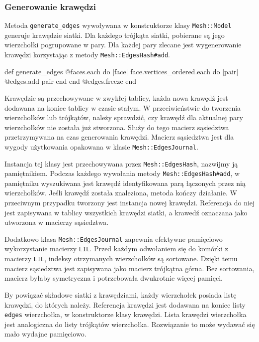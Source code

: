 \documentclass[10pt,a4paper]{article}
\newcommand{\f}[1]{\texttt{#1}}
\begin{document}
\subsubsection{Generowanie krawędzi}
\label{sec:generowanie_krawedzi}

Metoda \f{generate\_edges} wywoływana w konstruktorze klasy \f{Mesh::Model}
generuje krawędzie siatki. Dla każdego trójkąta siatki, pobierane są jego
wierzchołki pogrupowane w pary. Dla każdej pary zlecane jest wygenerowanie
krawędzi korzystając z metody \f{Mesh::EdgesHash\#add}.

\begin{SmallVerbatim}
    def generate_edges
      @faces.each do |face|
        face.vertices_ordered.each do |pair|
          @edges.add pair
        end
      end
      @edges.freeze
    end
\end{SmallVerbatim}

Krawędzie są przechowywane w zwykłej tablicy, każda nowa krawędź jest dodawana
na koniec tablicy w czasie stałym. W przeciwieństwie do tworzenia wierzchołków
lub trójkątów, należy sprawdzić, czy krawędź dla aktualnej pary wierzchołków
nie została już stworzona. Służy do tego macierz sąsiedztwa przetrzymywana na
czas generowania krawędzi. Macierz sąsiedztwa jest dla wygody użytkowania
opakowana w klasie \f{Mesh::EdgesJournal}.

Instancja tej klasy jest przechowywana przez \f{Mesh::EdgesHash}, nazwijmy ją
pamiętnikiem. Podczas każdego wywołania metody \f{Mesh::EdgesHash\#add}, w
pamiętniku wyszukiwana jest krawędź identyfikowana parą łączonych przez nią
wierzchołków. Jeśli krawędź została znaleziona, metoda kończy działanie. W
przeciwnym przypadku tworzony jest instancja nowej krawędzi. Referencja do
niej jest zapisywana w tablicy wszystkich krawędzi siatki, a krawedź oznaczana
jako utworzona w macierzy sąsiedztwa.

Dodatkowo klasa \f{Mesh::EdgesJournal} zapewnia efektywne pamięciowo
wykorzystanie macierzy \f{LIL}. Przed każdym odwołaniem się do komórki z
macierzy \f{LIL}, indeksy otrzymanych wierzchołków są sortowane. Dzięki temu
macierz sąsiedztwa jest zapisywana jako macierz trójkątna górna. Bez
sortowania, macierz byłaby symetryczna i potrzebowała dwukrotnie więcej
pamięci.

By powiązać składowe siatki z krawędziami, każdy wierzchołek posiada listę
krawędzi, do których należy. Referencja krawędzi jest dodawana na koniec listy
\f{edges} wierzchołka, w konstruktorze klasy krawędzi. Lista krawędzi
wierzchołka jest analogiczna do listy trójkątów wierzchołka. Rozwiązanie to
może wydawać się mało wydajne pamięciowo.
\end{document}
